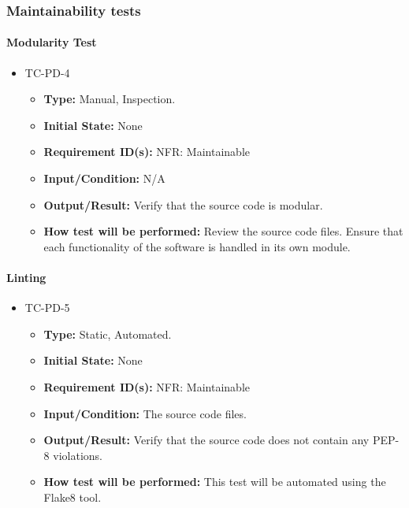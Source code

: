 \documentclass[12pt, titlepage]{article}
\begin{document}
\subsubsection{Maintainability tests}

\paragraph{Modularity Test}
\begin{itemize}
\item{TC-PD-4\\}
\begin{itemize}
\item{\textbf{Type:}} Manual, Inspection.
					
\item{\textbf{Initial State:}} None

\item{\textbf{Requirement ID(s):}} NFR: Maintainable
					
\item{\textbf{Input/Condition:}}  N/A
					
\item{\textbf{Output/Result:}} Verify that the source code is modular.

\item{\textbf{How test will be performed:}}  
Review the source code files. Ensure that each functionality of the software is 
handled in its own module.
\end{itemize}
\end{itemize}

\paragraph{Linting}

\begin{itemize}
\item{TC-PD-5\\}
\begin{itemize}

\item{\textbf{Type:}} Static, Automated.
					
\item{\textbf{Initial State:}} None

\item{\textbf{Requirement ID(s):}} NFR: Maintainable
					
\item{\textbf{Input/Condition:}}  The source code files.
					
\item{\textbf{Output/Result:}} Verify that the source code does not contain any PEP-8 violations.

\item{\textbf{How test will be performed:}}   This test will be automated using the 
Flake8 \cite{Flake8} tool.

\end{itemize}
\end{itemize}
\end{document}
